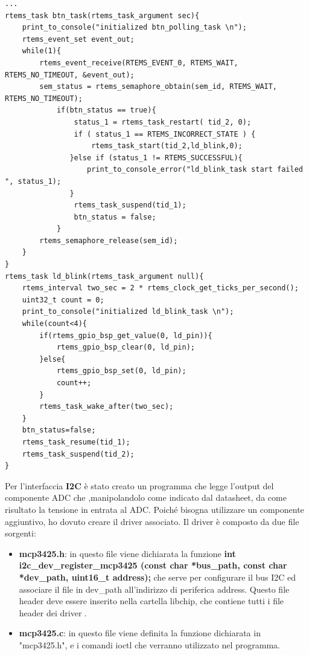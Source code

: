 \documentclass[12pt, a4paper, titlepage, oneside]{book}
\begin{document}
\begin{lstlisting}[style = CStyle]
...
rtems_task btn_task(rtems_task_argument sec){
	print_to_console("initialized btn_polling_task \n");
	rtems_event_set event_out;
	while(1){
		rtems_event_receive(RTEMS_EVENT_0, RTEMS_WAIT, RTEMS_NO_TIMEOUT, &event_out);
		sem_status = rtems_semaphore_obtain(sem_id, RTEMS_WAIT, RTEMS_NO_TIMEOUT);
			if(btn_status == true){
				status_1 = rtems_task_restart( tid_2, 0);
				if ( status_1 == RTEMS_INCORRECT_STATE ) {
					rtems_task_start(tid_2,ld_blink,0);
			   }else if (status_1 != RTEMS_SUCCESSFUL){
				   print_to_console_error("ld_blink_task start failed ", status_1);
			   }
				rtems_task_suspend(tid_1);
				btn_status = false;
			}
		rtems_semaphore_release(sem_id);
	}
}
rtems_task ld_blink(rtems_task_argument null){
	rtems_interval two_sec = 2 * rtems_clock_get_ticks_per_second();
	uint32_t count = 0;
	print_to_console("initialized ld_blink_task \n");
	while(count<4){
		if(rtems_gpio_bsp_get_value(0, ld_pin)){
			rtems_gpio_bsp_clear(0, ld_pin);
		}else{
			rtems_gpio_bsp_set(0, ld_pin);
			count++;
		}
		rtems_task_wake_after(two_sec);
	}
	btn_status=false;
	rtems_task_resume(tid_1);
	rtems_task_suspend(tid_2);
}
\end{lstlisting}
\newpage
Per l'interfaccia \textbf{I2C} è stato creato un programma che legge l'output del componente ADC che ,manipolandolo come indicato dal datasheet, da come risultato la tensione in entrata al ADC. Poiché bisogna utilizzare un componente aggiuntivo, ho dovuto creare il driver associato.\newline
Il driver è composto da due file sorgenti:
\begin{itemize}
    \item \textbf{mcp3425.h}: in questo file viene dichiarata la funzione \textbf{int i2c\_dev\_register\_\newline mcp3425 (const char *bus\_path, const char *dev\_path, uint16\_t address);} che serve per configurare il bus I2C ed associare il file in dev\_path all'indirizzo di periferica address.
    Questo file header deve essere inserito nella cartella libchip, che contiene tutti i file header dei driver .
    \item \textbf{mcp3425.c}: in questo file viene definita la funzione dichiarata in "mcp3425.h", e i comandi ioctl che verranno utilizzato nel programma.
\end{itemize}
\end{document}
